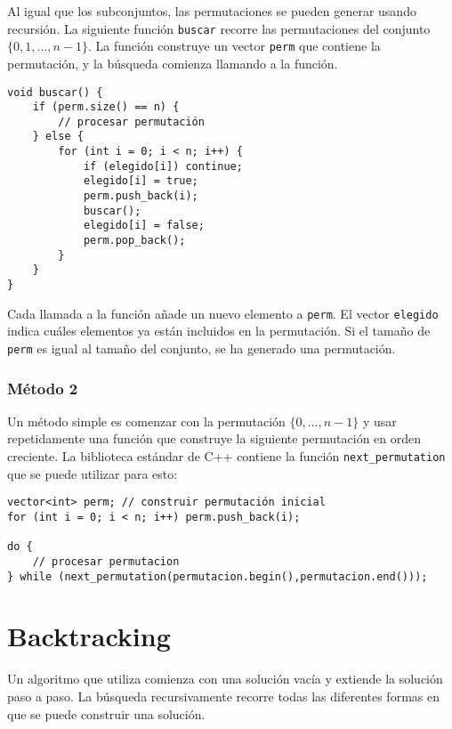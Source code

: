 Al igual que los subconjuntos, las permutaciones se pueden generar
usando recursión.
La siguiente función \texttt{buscar} recorre
las permutaciones del conjunto $\{0,1,\ldots,n-1\}$.
La función construye un vector \texttt{perm}
que contiene la permutación,
y la búsqueda comienza llamando a la función.

\begin{lstlisting}
void buscar() {
    if (perm.size() == n) {
        // procesar permutación
    } else {
        for (int i = 0; i < n; i++) {
            if (elegido[i]) continue;
            elegido[i] = true;
            perm.push_back(i);
            buscar();
            elegido[i] = false;
            perm.pop_back();
        }
    }
}
\end{lstlisting}

Cada llamada a la función añade un nuevo elemento a
\texttt{perm}.
El vector \texttt{elegido} indica cuáles
elementos ya están incluidos en la permutación.
Si el tamaño de \texttt{perm} es igual al tamaño del conjunto,
se ha generado una permutación.

\subsubsection{Método 2}


Un método simple es comenzar con la permutación
$\{0,\ldots,n-1\}$ y usar repetidamente
una función que construye la siguiente permutación
en orden creciente.
La biblioteca estándar de C++ contiene la función
\texttt{next\_permutation} que se puede utilizar para esto:

\begin{lstlisting}
vector<int> perm; // construir permutación inicial
for (int i = 0; i < n; i++) perm.push_back(i);

do {
    // procesar permutacion
} while (next_permutation(permutacion.begin(),permutacion.end()));
\end{lstlisting}

\section{Backtracking}


Un algoritmo que utiliza 
comienza con una solución vacía
y extiende la solución paso a paso.
La búsqueda recursivamente
recorre todas las diferentes formas en que
se puede construir una solución.

